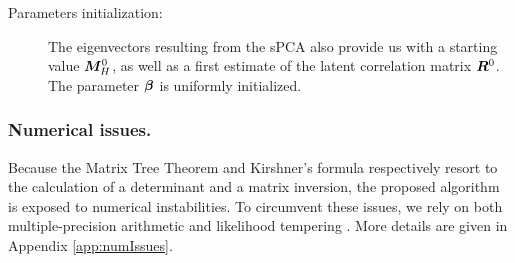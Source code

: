 \begin{description}
\item[Parameters initialization:]
The eigenvectors resulting from the sPCA also provide us with a starting value ${\boldsymbol{M}}^0_H$, as well as a first estimate of the latent correlation matrix ${\boldsymbol{R}}^0$. The parameter ${\boldsymbol{\beta}}$ is uniformly initialized.
\end{description}
 
\subsubsection*{Numerical issues.}

Because the Matrix Tree Theorem and Kirshner's formula respectively resort to the calculation of a determinant and a matrix inversion, the proposed algorithm is exposed to numerical instabilities. To circumvent these issues, we rely on both multiple-precision arithmetic and likelihood tempering \citep[via a parameter $\alpha$, similarly to][]{SR17}. More details are given in Appendix \ref{app:numIssues}.

 
